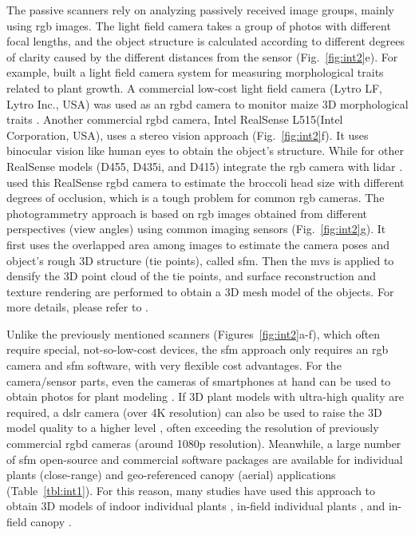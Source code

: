 The passive scanners rely on analyzing passively received image groups, mainly using \gls{rgb} images. The light field camera takes a group of photos with different focal lengths, and the object structure is calculated according to different degrees of clarity caused by the different distances from the sensor (Fig.~\ref{fig:int2}e). For example, \citet{apelt_phytotyping_2015} built a light field camera system for measuring morphological traits related to plant growth. A commercial low-cost light field camera (Lytro LF, Lytro Inc., USA) was used as an \gls{rgbd} camera to monitor maize 3D morphological traits \citep{schima_imagine_2016}. Another commercial \gls{rgbd} camera, Intel RealSense L515(Intel Corporation, USA), uses a stereo vision approach (Fig.~\ref{fig:int2}f). It uses binocular vision like human eyes to obtain the object's structure. While for other RealSense models (D455, D435i, and D415) integrate the \gls{rgb} camera with \gls{lidar} \citep{bartol_review_2021}. \citet{blok_image_2021} used this RealSense \gls{rgbd} camera to estimate the broccoli head size with different degrees of occlusion, which is a tough problem for common \gls{rgb} cameras. The photogrammetry approach is based on \gls{rgb} images obtained from different perspectives (view angles) using common imaging sensors (Fig.~\ref{fig:int2}g). It first uses the overlapped area among images to estimate the camera poses and object's rough 3D structure (tie points), called \acrfull{sfm}. Then the \gls{mvs} is applied to densify the 3D point cloud of the tie points, and surface reconstruction and texture rendering are performed to obtain a 3D mesh model of the objects. For more details, please refer to \citep{hartley_multiple_2000, snavely_scene_2010}.

Unlike the previously mentioned scanners (Figures~\ref{fig:int2}a-f), which often require special, not-so-low-cost devices, the \gls{sfm} approach only requires an \gls{rgb} camera and \gls{sfm} software, with very flexible cost advantages. For the camera/sensor parts, even the cameras of smartphones at hand can be used to obtain photos for plant modeling \citep{li_measuring_2020}. If 3D plant models with ultra-high quality are required, a \gls{dslr} camera (over 4K resolution) can also be used to raise the 3D model quality to a higher level \citep{nguyen_3d_2016, drofova_use_2023}, often exceeding the resolution of previously commercial \gls{rgbd} cameras (around 1080p resolution). Meanwhile, a large number of \gls{sfm} open-source and commercial software packages are available for individual plants (close-range) and geo-referenced canopy (aerial) applications (Table~\ref{tbl:int1}). For this reason, many studies have used this approach to obtain 3D models of indoor individual plants \citep{wu_mvs-pheno_2020, zhou_automated_2019}, in-field individual plants \citep{jay_field_2015, herrero_structural_2023}, and in-field canopy \citep{kim_modeling_2018, herrero_canopy_2020}.

